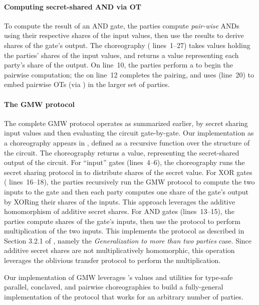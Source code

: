 \paragraph{Computing secret-shared AND via OT}
To compute the result of an AND gate, the parties compute \emph{pair-wise} ANDs using their respective shares of the input values,
then use the results to derive shares of the gate's output.
The  choreography ( lines~1--27)
takes  values holding the parties' shares of the input values,
and returns a  value representing each party's share of the output.
On line~10, the parties perform a  to begin the pairwise computation;
the  on line~12 completes the pairing,
and uses  (line~20) to embed pairwise OTs (via ) in the larger set of parties.

\paragraph{The GMW protocol}
The complete GMW protocol operates as summarized earlier, by secret sharing input values and then evaluating the circuit gate-by-gate.
Our implementation as a \MultiChor choreography appears in ,
defined as a recursive function over the structure of the circuit.
The choreography returns a  value, representing the secret-shared output of the circuit.
For ``input'' gates (lines~4--6), the choreography runs the secret sharing protocol in 
to distribute shares of the secret value.
For XOR gates ( lines~16--18),
the parties recursively run the GMW protocol to compute the two inputs to the gate
and then each party computes one share of the gate's output by XORing their shares of the inputs.
This approach leverages the additive homomorphism of additive secret shares.
For AND gates (lines~13--15), the parties compute shares of the gate's inputs,
then use the  protocol to perform multiplication of the two inputs.
This implements the protocol as described in  Section 3.2.1 of \cite{evans2018pragmatic},
namely the \emph{Generalization to more than two parties} case.
Since additive secret shares are not multiplicatively homomorphic,
this operation leverages the oblivious transfer protocol to perform the multiplication.

Our implementation of GMW leverages \MultiChor's  values
and utilities for type-safe parallel, conclaved, and pairwise choreographies to build a fully-general implementation
of the protocol that works for an arbitrary number of parties.


